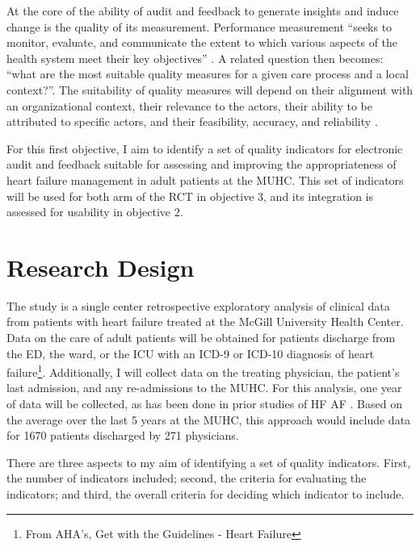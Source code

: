 

At the core of the ability of audit and feedback to generate insights and induce change is the quality of its measurement. Performance measurement ``seeks to monitor, evaluate, and communicate the extent to which various aspects of the health system meet their key objectives'' \cite{smith2009performance}. A related question then becomes: ``what are the most suitable quality measures for a given care process and a local context?''. The suitability of quality measures will depend on their alignment with an organizational context, their relevance to the actors, their ability to be attributed to specific actors, and their feasibility, accuracy, and reliability \cite{polanczyk2019quality}.

For this first objective, I aim to identify a set of quality indicators for electronic audit and feedback suitable for assessing and improving the appropriateness of heart failure management in adult patients at the MUHC. This set of indicators will be used for both arm of the RCT in objective 3, and its integration is assessed for usability in objective 2.

\section{Research Design}
The study is a single center retrospective exploratory analysis of clinical data from patients with heart failure treated at the McGill University Health Center. Data on the care of adult patients will be obtained for patients discharge from the ED, the ward, or the ICU with an ICD-9 or ICD-10 diagnosis of heart failure\footnote{From AHA's, Get with the Guidelines\textsuperscript{\textcopyright} - Heart Failure}. Additionally, I will collect data on the treating physician, the patient's last admission, and any re-admissions to the \gls{MUHC}. For this analysis, one year of data will be collected, as has been done in prior studies of \gls{HF} \gls{AF} \cite{kasje2006educational}. Based on the average over the last 5 years at the MUHC, this approach would include data for 1670 patients discharged by 271 physicians.

There are three aspects to my aim of identifying a set of quality indicators. First, the number of indicators included; second, the criteria for evaluating the indicators; and third, the overall criteria for deciding which indicator to include.

